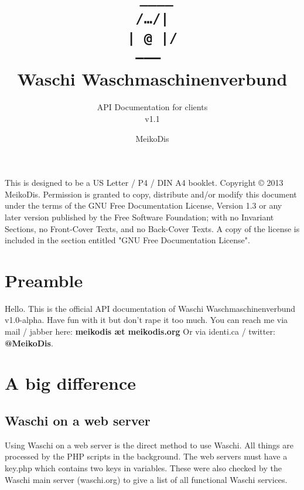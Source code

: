 \documentclass[letterpaper,twoside]{scrartcl}
\title{ 
 \texttt{
  \_\_\_\_ \\
  /…/|\\
  | @ |/\\
  \hspace{-8mm}
  --------
 } \\Waschi Waschmaschinenverbund}
\subtitle{API Documentation for clients \\ v1.1}
\author{MeikoDis}
\begin{document}
 \maketitle
 \thispagestyle{empty}


 \newpage
 \vspace*{\fill}
 This is designed to be a US Letter / P4 / DIN A4 booklet.
 \null
 \vfill
 Copyright ©  2013   MeikoDis.\newline\newline
 Permission is granted to copy, distribute and/or modify this document
 under the terms of the GNU Free Documentation License, Version 1.3
 or any later version published by the Free Software Foundation;
 with no Invariant Sections, no Front-Cover Texts, and no Back-Cover Texts.
 A copy of the license is included in the section entitled "GNU
 Free Documentation License".


 \newpage
 \tableofcontents


 \newpage
 \section{Preamble}

  Hello. This is the official API documentation of Waschi Waschmaschinenverbund v1.0-alpha. Have fun with it but don't rape it too much.
  \newline
  You can reach me via mail / jabber here: \textbf{meikodis æt meikodis.org}
  \newline
  Or via identi.ca / twitter: \textbf{@MeikoDis}.
  \newline


 \section{A big difference}

  \subsection{Waschi on a web server}
   Using Waschi on a web server is the direct method to use Waschi. 
   All things are processed by the PHP scripts in the background. 
   The web servers must have a key.php which contains two keys in variables.
   These were also checked by the Waschi main server (waschi.org) to give a list of all functional Waschi services.
\end{document}
